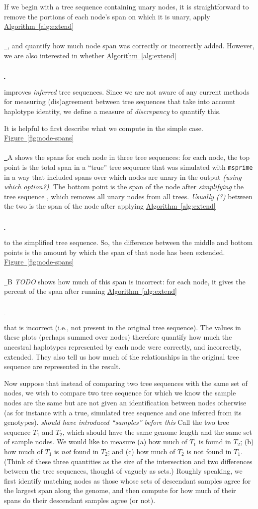 \documentclass[10pt,twoside,lineno]{gsajnl}
\newcommand{\comment}[1]{{\color{violet} \it #1}}
\newcommand{\algorithmref}[2][]{%
	\hyperref[{#2}]{%
		Algorithm~\ref*{#2}%
		\ifx\\#1\\%
		\else
		\,#1%
		\fi
	}%
}
\newcommand*{\figref}[2][]{%
	\hyperref[{#2}]{%
		Figure~\ref*{#2}%
		\ifx\\#1\\%
		\else
		\,#1%
		\fi
	}%
}
\begin{document}
If we begin with a tree sequence containing unary nodes,
it is straightforward to remove the portions of each node's span on which it is unary,
apply \algorithmref{alg:extend},
and quantify how much node span was correctly or incorrectly added.
However, we are also interested in whether \algorithmref{alg:extend}
improves \emph{inferred} tree sequences.
Since we are not aware of any current methods for measuring (dis)agreement between tree sequences
that take into account haplotype identity,
we define a measure of \emph{discrepancy} to quantify this.

It is helpful to first describe what we compute in the simple case.
\figref{fig:node-spans}A shows the spans for each node in three tree sequences:
for each node, the top point is the total span in a ``true'' tree sequence
that was simulated with \texttt{msprime} \citep{kelleher2016efficient}
in a way that included spans over which nodes are unary in the output
\comment{(using which option?)}.
The bottom point is the span of the node after \emph{simplifying} the tree sequence
\citep{kelleher2018efficient},
which removes all unary nodes from all trees.
\comment{Usually (?)} between the two is the span of the node after applying \algorithmref{alg:extend}
to the simplified tree sequence.
So, the difference between the middle and bottom points is the amount by which
the span of that node has been extended.
\figref{fig:node-spans}B \comment{TODO} shows how much of this span is incorrect:
for each node, it gives the percent of the span after running \algorithmref{alg:extend}
that is incorrect (i.e., not present in the original tree sequence).
The values in these plots (perhaps summed over nodes)
therefore quantify how much the ancestral haplotypes represented by each node
were correctly, and incorrectly, extended.
They also tell us how much of the relationships in the original tree sequence
are represented in the result.

Now suppose that instead of comparing two tree sequences with the same set of nodes,
we wish to compare two tree sequence for which we know the sample nodes are the same
but are not given an identification between nodes otherwise
(as for instance with a true, simulated tree sequence and one inferred from its genotypes).
\comment{should have introduced ``samples'' before this}
Call the two tree sequence $T_1$ and $T_2$, which should have the same genome length
and the same set of sample nodes.
We would like to measure (a) how much of $T_1$ is found in $T_2$;
(b) how much of $T_1$ is \emph{not} found in $T_2$; and
(c) how much of $T_2$ is not found in $T_1$.
(Think of these three quantities as the size of the intersection
and two differences between the tree sequences,
thought of vaguely as sets.)
Roughly speaking, we first identify matching nodes
as those whose sets of descendant samples agree for the largest span along the genome,
and then compute for how much of their spans do their descendant samples agree (or not).
\end{document}
